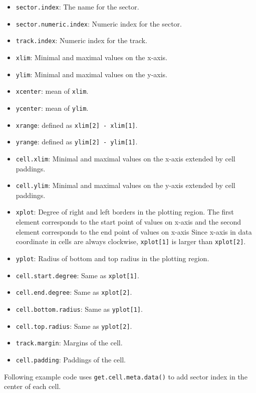\documentclass[]{book}
\providecommand{\tightlist}{%
  \setlength{\itemsep}{0pt}\setlength{\parskip}{0pt}}
\begin{document}
\begin{itemize}
\tightlist
\item
  \texttt{sector.index}: The name for the sector.
\item
  \texttt{sector.numeric.index}: Numeric index for the sector.
\item
  \texttt{track.index}: Numeric index for the track.
\item
  \texttt{xlim}: Minimal and maximal values on the x-axis.
\item
  \texttt{ylim}: Minimal and maximal values on the y-axis.
\item
  \texttt{xcenter}: mean of \texttt{xlim}.
\item
  \texttt{ycenter}: mean of \texttt{ylim}.
\item
  \texttt{xrange}: defined as \texttt{xlim{[}2{]}\ -\ xlim{[}1{]}}.
\item
  \texttt{yrange}: defined as \texttt{ylim{[}2{]}\ -\ ylim{[}1{]}}.
\item
  \texttt{cell.xlim}: Minimal and maximal values on the x-axis extended
  by cell paddings.
\item
  \texttt{cell.ylim}: Minimal and maximal values on the y-axis extended
  by cell paddings.
\item
  \texttt{xplot}: Degree of right and left borders in the plotting
  region. The first element corresponds to the start point of values on
  x-axis and the second element corresponds to the end point of values
  on x-axis Since x-axis in data coordinate in cells are always
  clockwise, \texttt{xplot{[}1{]}} is larger than \texttt{xplot{[}2{]}}.
\item
  \texttt{yplot}: Radius of bottom and top radius in the plotting
  region.
\item
  \texttt{cell.start.degree}: Same as \texttt{xplot{[}1{]}}.
\item
  \texttt{cell.end.degree}: Same as \texttt{xplot{[}2{]}}.
\item
  \texttt{cell.bottom.radius}: Same as \texttt{yplot{[}1{]}}.
\item
  \texttt{cell.top.radius}: Same as \texttt{yplot{[}2{]}}.
\item
  \texttt{track.margin}: Margins of the cell.
\item
  \texttt{cell.padding}: Paddings of the cell.
\end{itemize}

Following example code uses \texttt{get.cell.meta.data()} to add sector
index in the center of each cell.
\end{document}
